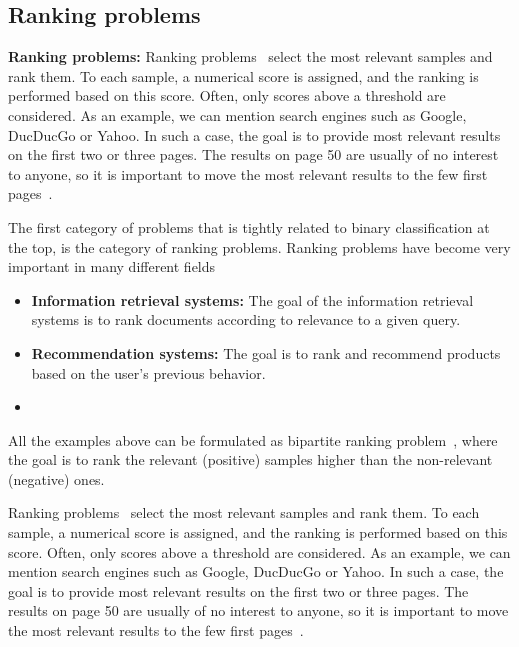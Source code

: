 \subsection{Ranking problems}


\textbf{Ranking problems:} Ranking problems~\cite{freund2003efficient, agarwal2011infinite, rudin2009pnorm, li2014top} select the most relevant samples and rank them. To each sample, a numerical score is assigned, and the ranking is performed based on this score. Often, only scores above a threshold are considered. As an example, we can mention search engines such as Google, DucDucGo or Yahoo. In such a case, the goal is to provide most relevant results on the first two or three pages. The results on page 50 are usually of no interest to anyone, so it is important to move the most relevant results to the few first pages~\cite{cortes2003auc}.

The first category of problems that is tightly related to binary classification at the top, is the category of ranking problems. Ranking problems have become very important in many different fields
\begin{itemize}
  \item \textbf{Information retrieval systems:} The goal of the information retrieval systems is to rank documents according to relevance to a given query.
  \item \textbf{Recommendation  systems:} The goal is to rank and recommend products based on the user's previous behavior.
  \item 
\end{itemize}
All the examples above can be formulated as bipartite ranking problem~\cite{freund2003efficient, agarwal2005generalization, agarwal2011infinite}, where the goal is to rank the relevant (positive) samples higher than the non-relevant (negative) ones. 

Ranking problems~\cite{freund2003efficient, agarwal2011infinite, rudin2009pnorm, li2014top} select the most relevant samples and rank them. To each sample, a numerical score is assigned, and the ranking is performed based on this score. Often, only scores above a threshold are considered. As an example, we can mention search engines such as Google, DucDucGo or Yahoo. In such a case, the goal is to provide most relevant results on the first two or three pages. The results on page 50 are usually of no interest to anyone, so it is important to move the most relevant results to the few first pages~\cite{cortes2003auc}.

